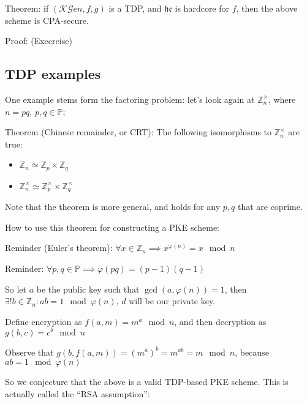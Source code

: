 Theorem: if $(\mathcal{KG}en, f, g)$ is a TDP, and $\mathfrak{hc}$ is hardcore for $f$, then the above scheme is CPA-secure.

Proof: (Execrcise)

\subsection{TDP examples}

One example stems form the factoring problem: let's look again at $\mathbb{Z}_n^\times$, where $n = pq$, $p, q \in \mathbb{P}$;

Theorem (Chinese remainder, or CRT): The following isomorphisms to $\mathbb{Z}_n^\times$ are true:

\begin{itemize}
   \item $\mathbb{Z}_n \simeq \mathbb{Z}_p \times \mathbb{Z}_q$
   \item $\mathbb{Z}_n^\times \simeq \mathbb{Z}_p^\times \times \mathbb{Z}_q^\times$
\end{itemize}

Note that the theorem is more general, and holds for any $p, q$ that are coprime.

How to use this theorem for constructing a PKE scheme:

Reminder (Euler's theorem): $\forall x \in \mathbb{Z}_n \implies x^{\varphi(n)} = x \mod n$

Reminder: $\forall p, q \in \mathbb{P} \implies \varphi(pq) = (p-1)(q-1)$

So let $a$ be the public key such that $\gcd(a, \varphi(n))=1$, then $\exists! b \in \mathbb{Z}_n : ab = 1 \mod \varphi(n)$, $d$ will be our private key.

Define encryption as $f(a, m) = m^a \mod n$, and then decryption as $g(b, c) = c^b \mod n$

Observe that $g(b, f(a, m)) = (m^a)^b = m^{ab} = m \mod n$, because $ab = 1 \mod \varphi(n)$

So we conjecture that the above is a valid TDP-based PKE scheme. This is actually called the ``RSA assumption'':

